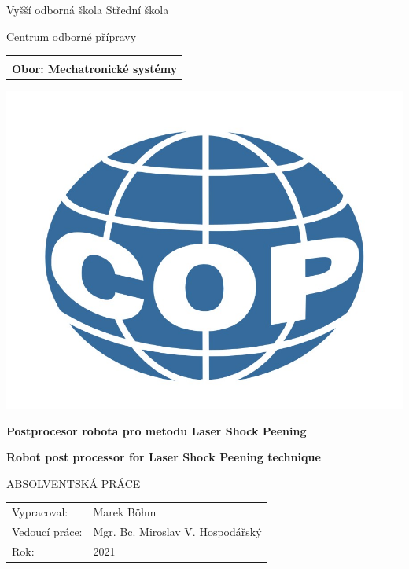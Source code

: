\documentclass[a4paper,twoside,12pt]{book}
\newcommand{\tb}{\textbf} %
\newcommand{\cvut}{Vyšší odborná škola Střední škola }
\newcommand{\fjfi}{Centrum odborné přípravy}
\newcommand{\ksi}{}
\newcommand{\obor}{Mechatronické systémy} %
\newcommand{\druh}{Absolventská práce} %
\newcommand{\logoCVUT}{\includegraphics{copsu_logo.jpg}} %
\newcommand{\nazevcz}{Postprocesor robota pro metodu Laser Shock Peening}    %
\newcommand{\nazeven}{Robot post processor for Laser Shock Peening technique}          %
\newcommand{\autor}{Marek Böhm}   %
\newcommand{\vedouci}{Mgr. Bc. Miroslav V. Hospodářský} %
\newcommand{\rok}{2021}  %
\begin{document}
\thispagestyle{empty}

\begin{center}
	{\LARGE
		\cvut\par
		\fjfi
	}
    \vspace{10mm}

    \begin{tabular}{c}
		\tb{\ksi} \\[3pt]   
		\tb{Obor: \obor}\\
    \end{tabular}

   \vspace{10mm} \logoCVUT \vspace{15mm} 

   {\huge \tb{\nazevcz}\par}
   \vspace{5mm}   
   {\huge \tb{\nazeven}\par}
   
   \vspace{15mm}
   {\Large \MakeUppercase{\druh}}

   \vfill
   {\large
    \begin{tabular}{ll}
    Vypracoval: & \autor\\
    Vedoucí práce: & \vedouci\\
    Rok: & \rok
    \end{tabular}
   }
\end{center}

\clearpage{\pagestyle{empty}\cleardoublepage} %

\newpage  %
\thispagestyle{empty} %

%
%
%
\end{document}
